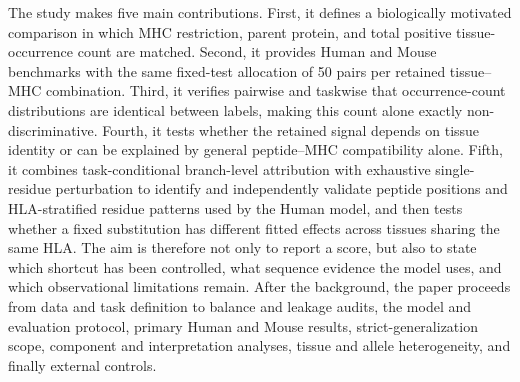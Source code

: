 The study makes five main contributions. First, it defines a biologically motivated comparison in which MHC restriction, parent protein, and total positive tissue-occurrence count are matched. Second, it provides Human and Mouse benchmarks with the same fixed-test allocation of 50 pairs per retained tissue--MHC combination. Third, it verifies pairwise and taskwise that occurrence-count distributions are identical between labels, making this count alone exactly non-discriminative. Fourth, it tests whether the retained signal depends on tissue identity or can be explained by general peptide--MHC compatibility alone. Fifth, it combines task-conditional branch-level attribution with exhaustive single-residue perturbation to identify and independently validate peptide positions and HLA-stratified residue patterns used by the Human model, and then tests whether a fixed substitution has different fitted effects across tissues sharing the same HLA. The aim is therefore not only to report a score, but also to state which shortcut has been controlled, what sequence evidence the model uses, and which observational limitations remain. After the background, the paper proceeds from data and task definition to balance and leakage audits, the model and evaluation protocol, primary Human and Mouse results, strict-generalization scope, component and interpretation analyses, tissue and allele heterogeneity, and finally external controls.
